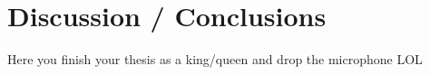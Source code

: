\chapter{Discussion / Conclusions}
Here you finish your thesis as a king/queen and drop the microphone LOL